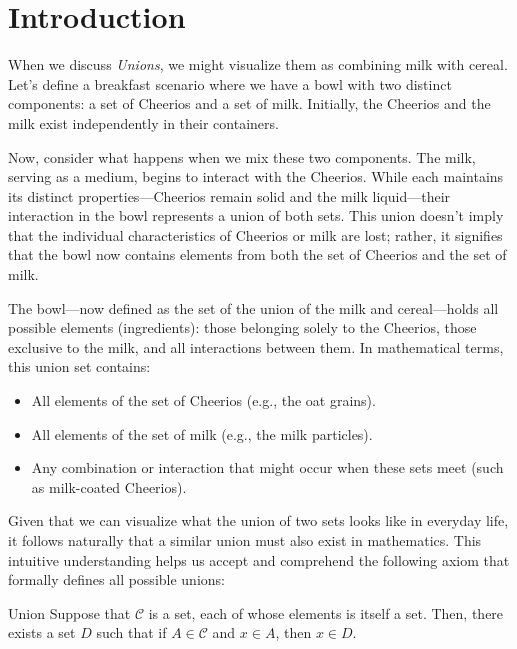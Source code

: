 \renewcommand{\theenumi}{\arabic{enumi}}
\renewcommand{\labelenumi}{\theenumi.}
\section{Introduction}

    When we discuss \textit{Unions}, we might visualize them as combining milk with cereal. Let's define a breakfast scenario where we have a bowl with two distinct components: a set of Cheerios and a set of milk. Initially, the Cheerios and the milk exist independently in their containers.

Now, consider what happens when we mix these two components. The milk, serving as a medium, begins to interact with the Cheerios. While each maintains its distinct properties---Cheerios remain solid and the milk liquid---their interaction in the bowl represents a union of both sets. This union doesn't imply that the individual characteristics of Cheerios or milk are lost; rather, it signifies that the bowl now contains elements from both the set of Cheerios and the set of milk.

The bowl---now defined as the set of the union of the milk and cereal---holds all possible elements (ingredients): those belonging solely to the Cheerios, those exclusive to the milk, and all interactions between them. In mathematical terms, this union set contains:
\begin{itemize} 
    \item All elements of the set of Cheerios (e.g., the oat grains).
    \item All elements of the set of milk (e.g., the milk particles).
    \item Any combination or interaction that might occur when these sets meet (such as milk-coated Cheerios).
\end{itemize}

\indent Given that we can visualize what the union of two sets looks like in everyday life, it follows naturally that a similar union must also exist in mathematics. This intuitive understanding helps us accept and comprehend the following axiom that formally defines all possible unions:

\begin{axiom}{Union}
    Suppose that $\mathcal{C}$ is a set, each of whose elements is itself a set. Then, there exists a set $D$ such that if $A \in \mathcal{C}$ and $x \in A$, then $x \in D$.
\end{axiom}

